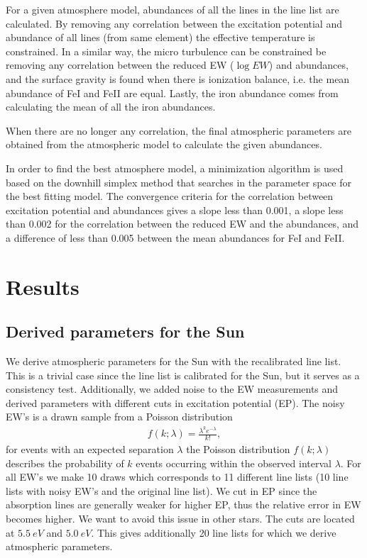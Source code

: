 \documentclass{aa}
\begin{document}
For a given atmosphere model, abundances of all the lines in the line
list are calculated. By removing any correlation between the excitation
potential and abundance of all lines (from same element) the effective
temperature is constrained. In a similar way, the micro turbulence can
be constrained be removing any correlation between the reduced EW ($\log
EW$) and abundances, and the surface gravity is found when there is
ionization balance, i.e. the mean abundance of FeI and FeII are equal.
Lastly, the iron abundance comes from calculating the mean of
all the iron abundances.

When there are no longer any correlation, the final atmospheric
parameters are obtained from the atmospheric model to calculate the
given abundances.

In order to find the best atmosphere model, a minimization algorithm
is used based on the downhill simplex method \citep{Press1992} that
searches in the parameter space for the best fitting model. The
convergence criteria for the correlation between excitation potential
and abundances gives a slope less than 0.001, a slope less than 0.002
for the correlation between the reduced EW and the abundances, and a
difference of less than 0.005 between the mean abundances for FeI and
FeII.







\section{Results}
\label{sec:results}


\subsection{Derived parameters for the Sun}
\label{sec:derived_parameters_of_the_sun}

We derive atmospheric parameters for the Sun with the recalibrated line
list. This is a trivial case since the line list is calibrated for the
Sun, but it serves as a consistency test. Additionally, we added noise
to the EW measurements and derived parameters with different cuts in
excitation potential (EP). The noisy EW's is a drawn sample from a
Poisson distribution \begin{align} f(k; \lambda) = \frac{\lambda^k
e^{-\lambda}}{k!}, \end{align} for events with an expected separation
$\lambda$ the Poisson distribution $f(k; \lambda)$ describes the
probability of $k$ events occurring within the observed interval
$\lambda$. For all EW's we make 10 draws which corresponds to 11
different line lists (10 line lists with noisy EW's and the original
line list). We cut in EP since the absorption lines are generally weaker
for higher EP, thus the relative error in EW becomes higher. We want to
avoid this issue in other stars. The cuts are located at $\SI{5.5}{eV}$
and $\SI{5.0}{eV}$. This gives additionally 20 line lists for which we
derive atmospheric parameters.
\end{document}
